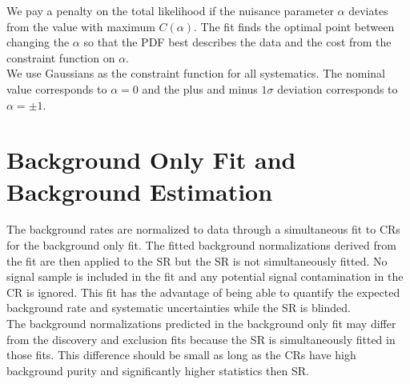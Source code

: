 
\indent We pay a penalty on the total likelihood if the nuisance parameter $\alpha$ deviates from the value with maximum $C(\alpha)$.  The fit finds the optimal point between changing the $\alpha$ so that the PDF best describes the data and the cost from the constraint function on $\alpha$. \\

\indent We use Gaussians as the constraint function for all systematics.  The nominal value corresponds to $\alpha = 0$ and the plus and minus $1\sigma$ deviation corresponds to $\alpha = \pm1$.  \\


\section{Background Only Fit and Background Estimation}
\label{sec:stat:bkgonly}

\indent The background rates are normalized to data through a simultaneous fit to CRs for the background only fit.  The fitted background normalizations derived from the fit are then applied to the SR but the SR is not simultaneously fitted.  No signal sample is included in the fit and any potential signal contamination in the CR is ignored.  This fit has the advantage of being able to quantify the expected background rate and systematic uncertainties while the SR is blinded. \\


\indent The background normalizations predicted in the background only fit may differ from the discovery and exclusion fits because the SR is simultaneously fitted in those fits. This difference should be small as long as the CRs have high background purity and significantly higher statistics then SR.  \\

